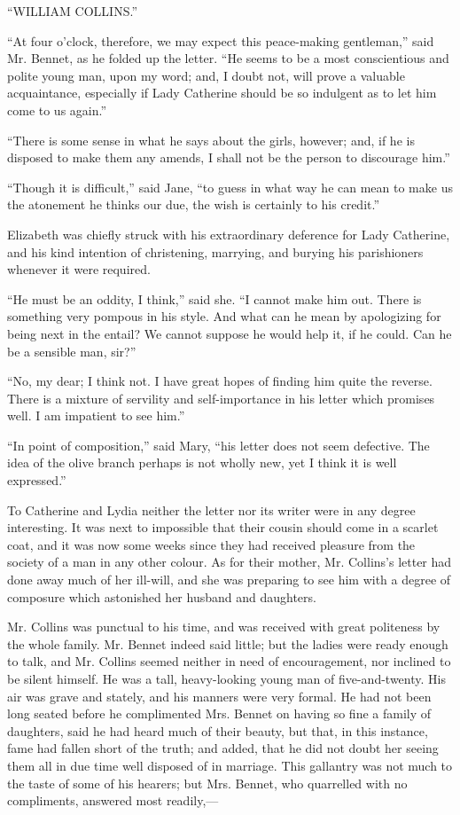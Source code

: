 \documentclass[12pt]{book}
\begin{document}
``WILLIAM COLLINS.''

``At four o'clock, therefore, we may expect this peace-making gentleman,'' said Mr. Bennet, as he folded up the letter. ``He seems to be a most conscientious and polite young man, upon my word; and, I doubt not, will prove a valuable acquaintance, especially if Lady Catherine should be so indulgent as to let him come to us again.''

``There is some sense in what he says about the girls, however; and, if he is disposed to make them any amends, I shall not be the person to discourage him.''

``Though it is difficult,'' said Jane, ``to guess in what way he can mean to make us the atonement he thinks our due, the wish is certainly to his credit.''

Elizabeth was chiefly struck with his extraordinary deference for Lady Catherine, and his kind intention of christening, marrying, and burying his parishioners whenever it were required.

``He must be an oddity, I think,'' said she. ``I cannot make him out. There is something very pompous in his style. And what can he mean by apologizing for being next in the entail? We cannot suppose he would help it, if he could. Can he be a sensible man, sir?''

``No, my dear; I think not. I have great hopes of finding him quite the reverse. There is a mixture of servility and self-importance in his letter which promises well. I am impatient to see him.''

``In point of composition,'' said Mary, ``his letter does not seem defective. The idea of the olive branch perhaps is not wholly new, yet I think it is well expressed.''

To Catherine and Lydia neither the letter nor its writer were in any degree interesting. It was next to impossible that their cousin should come in a scarlet coat, and it was now some weeks since they had received pleasure from the society of a man in any other colour. As for their mother, Mr. Collins's letter had done away much of her ill-will, and she was preparing to see him with a degree of composure which astonished her husband and daughters.

Mr. Collins was punctual to his time, and was received with great politeness by the whole family. Mr. Bennet indeed said little; but the ladies were ready enough to talk, and Mr. Collins seemed neither in need of encouragement, nor inclined to be silent himself. He was a tall, heavy-looking young man of five-and-twenty. His air was grave and stately, and his manners were very formal. He had not been long seated before he complimented Mrs. Bennet on having so fine a family of daughters, said he had heard much of their beauty, but that, in this instance, fame had fallen short of the truth; and added, that he did not doubt her seeing them all in due time well disposed of in marriage. This gallantry was not much to the taste of some of his hearers; but Mrs. Bennet, who quarrelled with no compliments, answered most readily,---
\end{document}
